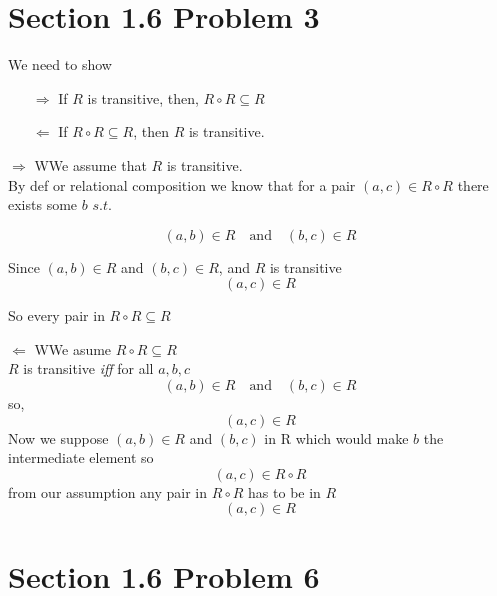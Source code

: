 \documentclass{report}
\begin{document}
\section*{Section 1.6 Problem 3}


\begin{keyideaWithLotus}
  We need to show 
  \begin{itemize}
    \item [$\Rightarrow$] If $R$ is transitive, then, $R \circ R \subseteq R$
    \item [$\Leftarrow$] If $R \circ R \subseteq R$, then $R$ is transitive.   
  \end{itemize}

\end{keyideaWithLotus}

\begin{RemarkWithLily}{$\Rightarrow$}
  WWe assume that $R$ is transitive. \\
  By def or relational composition we know that for a pair $(a,c) \in R \circ R$ there exists some $b$ $s.t.$ 

  \[ (a,b) \in R \quad \text{and} \quad (b,c) \in R \]

  Since $(a,b) \in R$ and $(b,c) \in R$, and $R$ is transitive
  \[ (a,c) \in R \]
  
  So every pair in $R \circ R \subseteq R$   
\end{RemarkWithLily}

\begin{RemarkWithLily}{$\Leftarrow$}
  WWe asume $R \circ R \subseteq R$ \\
  $R$ is transitive \textit{iff} for all $a,b,c$ 
  \[ (a,b) \in R \quad \text{and} \quad (b,c) \in R \]
  so, 
  \[ (a,c) \in R \]
  Now we suppose $(a,b) \in R $ and $(b,c)$ in R which would make $b$ the intermediate element so 
  \[ (a,c) \in R \circ R \]
  from our assumption any pair in $R \circ R$ has to be in $R$
  \[ (a,c) \in R \]     
\end{RemarkWithLily}

\section*{Section 1.6 Problem 6}

\end{document}
